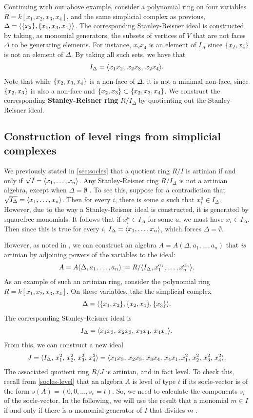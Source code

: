 Continuing with our above example, consider a polynomial ring on four variables $R = k[x_1, x_2, x_3, x_4]$, and the same simplicial complex as previous, $\Delta = \langle  \{ x_2 \}, \{ x_1, x_3, x_4 \}  \rangle$. The corresponding Stanley-Reisner ideal is constructed by taking, as monomial generators, the subsets of vertices of $V$ that are not faces $\Delta$ to be generating elements. For instance, $x_2 x_4$ is an element of $I_\Delta$ since $\{ x_2, x_4 \}$ is not an element of $\Delta$. By taking all such sets, we have that 
$$
I_\Delta = \langle x_1 x_2, \,  x_2 x_3, \, x_2 x_4 \rangle.
$$
Note that while $\{ x_2, x_3, x_4 \}$ is a non-face of $\Delta$, it is not a minimal non-face, since $\{ x_2, x_3 \}$ is also a non-face and $\{ x_2, x_3 \} \subset \{ x_2, x_3, x_4 \}$. We construct the corresponding \textbf{Stanley-Reisner ring} $R/I_\Delta$ by quotienting out the Stanley-Reisner ideal. 

\subsection{Construction of level rings from simplicial complexes}

We previously stated in \autoref{sec:socles} that a quotient ring $R/I$ is artinian if and only if $\sqrt{I} = \langle x_1, \dots, x_n \rangle$. Any Stanley-Reisner ring $R/I_\Delta$ is not a artinian algebra, except when $\Delta = \emptyset$ \cite{VanTuyl2010}. To see this, suppose for a contradiction that $\sqrt{I_\Delta} = \langle x_1, \dots, x_n \rangle$. Then for every $i$, there is some $a$ such that $x_i^a \in I_\Delta$. However, due to the way a Stanley-Reisner ideal is constructed, it is generated by squarefree monomials. It follows that if $x_i^a \in I_\Delta$ for some $a$, we must have $x_i \in I_\Delta$. Then since this is true for every $i$,  $I_\Delta = \langle x_1, \dots, x_n \rangle$, which forces $\Delta = \emptyset$. 

However, as noted in \cite{VanTuyl2010}, we can construct an algebra $A = A(\Delta, a_1, \dots, a_n)$ that \textit{is} artinian by adjoining powers of the variables to the ideal: 
$$
A = A(\Delta, a_1, \dots, a_n) : = R/\langle I_\Delta, x_1^{a_1}, \dots,x_n^{a_n} \rangle.
$$
As an example of such an artinian ring, consider the polynomial ring $R = k[x_1, x_2, x_3, x_4]$. On these variables, take the simplicial complex 
$$
\Delta = \langle \{ x_1, x_2 \}, \{ x_2, x_4 \}, \{ x_3 \} \rangle.
$$ 
The corresponding Stanley-Reisner ideal is 
$$
I_\Delta = \langle x_1x_3, \, x_2x_3, \, x_3x_4,\,  x_4 x_1 \rangle.
$$
From this, we can construct a new ideal 
$$
J = \langle I_\Delta, \, x_1^2,\,  x_2^2, \, x_3^2,\,  x_4^2 \rangle = \langle x_1x_3, \, x_2x_3, \, x_3x_4,\,  x_4 x_1,  x_1^2,\, \allowbreak x_2^2, \, x_3^2,\,  x_4^2 \rangle.
$$ 
The associated quotient ring $R/J$ is artinian, and in fact level. To check this, recall from \autoref{socles-level} that an algebra $A$ is level of type $t$ if its socle-vector is of the form $s(A) = (0, 0, \dots, s_e = t)$. So, we need to calculate the components $s_i$ of the socle-vector. In the following, we will use the result that a monomial $m \in I$ if and only if there is a monomial generator of $I$ that divides $m$ \cite{Herzog2011}. 

